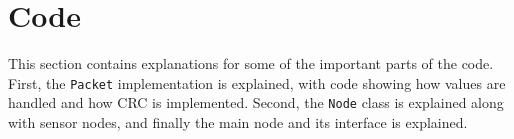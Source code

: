 \section{Code}
This section contains explanations for some of the important parts of the code. First, the \texttt{Packet} implementation is explained, with code showing how values are handled and how CRC is implemented. Second, the \texttt{Node} class is explained along with sensor nodes, and finally the main node and its interface is explained.



